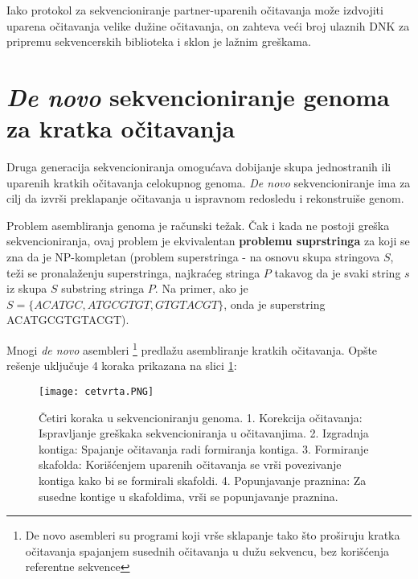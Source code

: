 \documentclass[12pt,oneside]{memoir}
\begin{document}
Iako protokol za sekvencioniranje partner-uparenih očitavanja može izdvojiti uparena očitavanja velike dužine očitavanja, on zahteva veći broj ulaznih DNK za pripremu sekvencerskih biblioteka i sklon je lažnim greškama.

\section{\textit{De novo} sekvencioniranje genoma za kratka očitavanja}

Druga generacija sekvencioniranja omogućava dobijanje skupa jednostranih ili uparenih kratkih očitavanja celokupnog genoma. \textit{De novo} sekvencioniranje ima za cilj da izvrši preklapanje očitavanja u ispravnom redosledu i rekonstruiše genom.

Problem asembliranja genoma je računski težak. Čak i kada ne postoji greška sekvencioniranja, ovaj problem je ekvivalentan \textbf{problemu suprstringa} za koji se zna da je NP-kompletan (problem superstringa - na osnovu skupa stringova $S$, teži se pronalaženju superstringa, najkraćeg stringa $P$ takavog da je svaki string $s$ iz skupa $S$ substring stringa $P$. Na primer, ako je $S = \{ACATGC, ATGCGTGT, GTGTACGT\}$, onda je superstring ACATGCGTGTACGT).

Mnogi \textit{de novo} asembleri \footnote{De novo asembleri su programi
koji vrše sklapanje tako što proširuju kratka očitavanja spajanjem susednih
očitavanja u dužu sekvencu, bez korišćenja referentne sekvence} predlažu asembliranje kratkih očitavanja. Opšte rešenje uključuje 4 koraka prikazana na slici \ref{fig:4}:

\begin{figure}[!ht]
  \centering
  \texttt{[image: cetvrta.PNG]}
  \caption{Četiri koraka u sekvencioniranju genoma. 1. Korekcija očitavanja:
Ispravljanje greškaka sekvencioniranja u očitavanjima. 2. Izgradnja kontiga: Spajanje
očitavanja radi formiranja kontiga. 3. Formiranje skafolda: Korišćenjem uparenih očitavanja se vrši povezivanje kontiga kako bi se formirali skafoldi. 4. Popunjavanje praznina: Za susedne kontige u skafoldima, vrši se popunjavanje praznina.}
  \label{fig:4}
\end{figure}

\newpage
\end{document}
